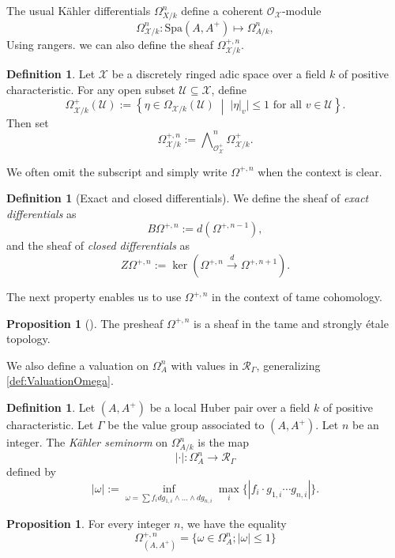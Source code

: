\documentclass{amsart}
\def\Spa{\textrm{Spa}}
\theoremstyle{definition}
\newtheorem{definition}[theorem]{Definition}
\newtheorem{proposition}[theorem]{Proposition}
\newcommand{\mX}{\mathcal{X}}
\newcommand{\mO}{\mathcal{O}}
\numberwithin{equation}{section}
\begin{document}
The usual Kähler differentials \( \Omega^n_{X/k} \) define a coherent \( \mathcal{O}_{\mathcal{X}} \)-module
\[
\Omega^{n}_{\mathcal{X}/k}:\Spa(A,A^+)\mapsto \Omega_{A/k}^n,
\]
 Using rangers. we can also define the sheaf $\Omega^{+,n}_{\mathcal{X}/k}$.
\begin{definition}
	
	Let \( \mathcal{X} \) be a discretely ringed adic space over a field \( k \) of positive characteristic. For any open subset \( \mathcal{U} \subseteq \mathcal{X} \), define
	\[
	\Omega^+_{\mathcal{X}/k}(\mathcal{U}) := \left\{ \eta \in \Omega_{\mathcal{X}/k}(\mathcal{U}) \;\middle|\; |\eta|_v|\leq 1 \text{ for all } v \in \mathcal{U} \right\}.
	\]
	Then set
	\[
	\Omega^{+,n}_{\mathcal{X}/k} := \bigwedge\nolimits^n_{\mO^+_\mX} \Omega^+_{\mathcal{X}/k}.
	\]
	
	We often omit the subscript and simply write \( \Omega^{+,n} \) when the context is clear.
	\begin{definition}[Exact and closed differentials]
		We define the sheaf of \emph{exact differentials} as
		\[
		B\Omega^{+,n} := d(\Omega^{+,n-1}),
		\]
		and the sheaf of \emph{closed differentials} as
		\[
	Z\Omega^{+,n} := \ker(\Omega^{+,n} \xrightarrow{d} \Omega^{+,n+1}).
		\]
		
	\end{definition}
\end{definition}
The next property enables us to use $\Omega^{+,n}$ in the context of tame cohomology.
\begin{proposition}[{\cite[Proposition 7.9]{LogDiff}}]
	The presheaf $\Omega^{+,n}$ is a sheaf in the tame and strongly \'etale topology.
\end{proposition}
We also define a valuation on $\Omega^n_{A}$ with values in $\mathcal{R}_\Gamma$, generalizing \cref{def:ValuationOmega}.
\begin{definition}
	Let $(A,A^+)$ be a local Huber pair over a field $k$ of positive characteristic. Let $\Gamma$ be the value group associated to $(A,A^+)$. Let $n$ be an integer. The \emph{Kähler seminorm} on $\Omega_{A/k}^n$ is the map
	\[
	|\cdot|: \Omega_A^n\to \mathcal{R}_\Gamma
	\]
	defined by 
	\[
	|\omega|:= \inf\limits_{\omega=\sum f_idg_{1,i}\wedge \dots\wedge dg_{n,i}} \max\limits_i\big\{|f_i \cdot g_{1,i}\cdots g_{n,i}| \big\}.
	\]
\end{definition}
\begin{proposition}\label{prop:EquivalentDescriptionsOmega+n}
	For every integer $n$, we have the equality 
	\begin{equation}\label{eq:twoDefOmega+n}
			\Omega_{(A,A^+)}^{+,n}=\big\{ \omega \in \Omega_A^n ; |\omega|\leq 1 \big\}
	\end{equation}
\end{proposition}
\end{document}
